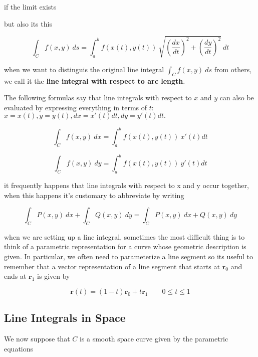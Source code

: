 \documentclass{article}
\begin{document}
if the limit exists


but also its this

\begin{equation*}
    \int_C f(x,y) \ ds = \int^b_a f(x(t), y(t)) \ \sqrt{(\frac{dx}{dt})^2 + (\frac{dy}{dt})^2} \  dt
\end{equation*}

when we want to distinguis the original line integral $\int_C f(x,y) \ ds $ from others, we call it the \textbf{line integral with respect to arc length}.

The following formulas say that line integrals with respect to $x$ and $y$ can also be evaluated by expressing everything in terms of $t$: $x = x(t), y = y(t), dx = x'(t)dt, dy = y'(t)dt.$

\begin{equation*}
    \int_C f(x,y) \ dx = \int^b_a f(x(t), y(t)) \ x'(t) dt 
\end{equation*}

\begin{equation*}
    \int_C f(x,y) \ dy = \int^b_a f(x(t), y(t)) \ y'(t) dt
\end{equation*}

it frequently happens that line integrals with respect to x and y occur together, when this happens it's customary to abbreviate by writing 

\begin{equation*}
    \int_C P(x,y) \ dx + \int_C Q(x,y) \ dy = \int_C P(x,y) \ dx + Q(x,y) \ dy
\end{equation*}

when we are setting up a line integral, sometimes the most difficult thing is to think of a parametric representation for a curve whose geometric description is given. In particular, we often need to parameterize a line segment so its useful to remember that a vector representation of a line segment that starts at $\mathbf{r}_0$ and ends at $\mathbf{r}_1$ is given by 

\begin{equation*}
    \mathbf{r}(t) = (1- t) \mathbf{r}_0 + t\mathbf{r}_1 \qquad 0 \leq t \leq 1
\end{equation*}

\subsection{Line Integrals in Space}

We now suppose that $C$ is a smooth space curve given by the parametric equations 
\end{document}
